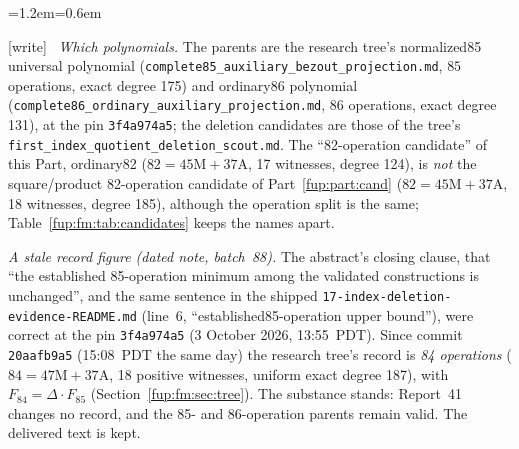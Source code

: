 \documentclass[11pt,letterpaper]{article}
\theoremstyle{definition}\newtheorem{definition}[theorem]{Definition}
\theoremstyle{remark}\newtheorem{remark}[theorem]{Remark}
\newcommand{\wtag}{\textup{[write]}}
\newenvironment{writenote}{\par\smallskip\begin{list}{}{\leftmargin=1.2em\rightmargin=0.6em}\item[]\small\wtag\ }{\end{list}\smallskip}
\newcommand{\rw}[1]{\nolinkurl{#1}}%
\begin{document}
\begin{writenote}
\emph{Which polynomials.} The parents are the research tree's normalized85 universal polynomial (\rw{complete85_auxiliary_bezout_projection.md}, $85$ operations, exact degree 175) and ordinary86 polynomial (\rw{complete86_ordinary_auxiliary_projection.md}, $86$ operations, exact degree 131), at the pin \texttt{3f4a974a5}; the deletion candidates are those of the tree's \rw{first_index_quotient_deletion_scout.md}. The ``82-operation candidate'' of this Part, ordinary82 ($82=45\mathrm M+37\mathrm A$, 17 witnesses, degree 124), is \emph{not} the square/product 82-operation candidate of Part~\ref{fup:part:cand} ($82=45\mathrm M+37\mathrm A$, 18 witnesses, degree 185), although the operation split is the same; Table~\ref{fup:fm:tab:candidates} keeps the names apart.

\emph{A stale record figure (dated note, batch~88).} The abstract's closing clause, that ``the established 85-operation minimum among the validated constructions is unchanged'', and the same sentence in the shipped \rw{17-index-deletion-evidence-README.md} (line~6, ``established85-operation upper bound''), were correct at the pin \texttt{3f4a974a5} (3 October 2026, 13:55~PDT). Since commit \texttt{20aafb9a5} (15:08~PDT the same day) the research tree's record is \emph{84 operations} ($84=47\mathrm M+37\mathrm A$, 18 positive witnesses, uniform exact degree 187), with $F_{84}=\Delta\cdot F_{85}$ (Section~\ref{fup:fm:sec:tree}). The substance stands: Report~41 changes no record, and the 85- and 86-operation parents remain valid. The delivered text is kept.


\end{writenote}
\end{document}
